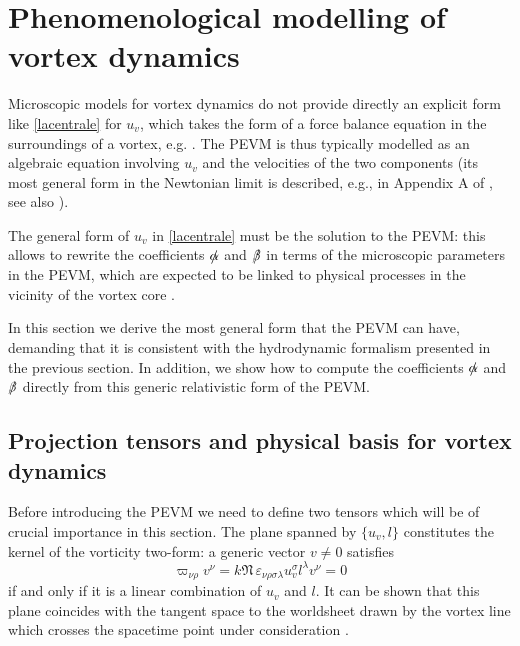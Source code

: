 \documentclass[preprints,article,accept,moreauthors,pdftex]{mdpi}
\begin{document}
 
 
\section{Phenomenological modelling of vortex dynamics}
\label{sezione3}

Microscopic  models for vortex dynamics do not provide directly an explicit form like \eqref{lacentrale} for $u_v$, which takes the form of a force balance equation in the surroundings of a vortex, e.g. \cite{andersson_sidery_2006,sourie_corepinn_2020MNRAS,sourie2020IJMPB,antonelli2020MNRAS}. 
The PEVM is thus typically modelled as an algebraic equation involving $u_v$ and the velocities of the two components (its most general form in the Newtonian limit is described, e.g., in Appendix A of \cite{antonelli2020MNRAS}, see also \cite{sourie2020IJMPB}). 

The general form of $u_v$ in \eqref{lacentrale} must be the solution to the PEVM: this allows to rewrite the coefficients $\slashed{\alpha}$ and $\slashed{\beta}$ in terms of the microscopic parameters in the PEVM, which are expected to be linked to physical processes in the vicinity of the vortex core \cite{barenghi1983JLTP,donnelly_book,sonin_book_2016}.

In this section we derive the most general form that the PEVM can have, demanding that it is consistent with the hydrodynamic formalism presented in the previous section. 
In addition, we show how to compute the coefficients $\slashed{\alpha}$ and $\slashed{\beta}$ directly from this generic relativistic form of the PEVM.

\subsection{Projection tensors and physical basis for vortex dynamics}

Before introducing the PEVM we need to define two tensors which will be of crucial importance in this section.
The plane spanned by $\{ u_v, l \}$ constitutes the kernel of the vorticity two-form: a generic vector $v \neq 0$ satisfies
\begin{equation}
\varpi_{\nu \rho} v^\nu =  k \mathfrak{N} \, \varepsilon_{\nu \rho \sigma \lambda} u_v^\sigma l^\lambda v^\nu=0
\end{equation}
if and only if it is a linear combination of $u_v$ and $l$. It can be shown that this plane coincides with the tangent space to the worldsheet drawn by the vortex line which crosses the spacetime point under consideration \cite{Carter_defects2000,GavassinoGeometria}.  
\end{document}
